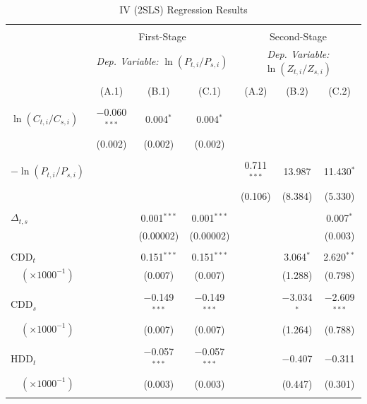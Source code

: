 \documentclass[11pt,a4paper]{extarticle}
\begin{document}
\begin{table}[!htbp] \centering 
	\caption{IV (2SLS) Regression Results}
	\label{table:2} 
	\small
	\begin{tabular}{@{\extracolsep{4pt}}lcccccc} 
		\\[-4ex]\hline  
		\hline \\[-1.6ex] 
		& \multicolumn{3}{c}{First-Stage} & \multicolumn{3}{c}{Second-Stage} \\ [0.5ex]
		& \multicolumn{3}{c}{\textit{Dep. Variable:} $\ln (P_{t,i} / P_{s,i})$ } & \multicolumn{3}{c}{\textit{Dep. Variable:}  $\ln (Z_{ t, i} / Z_{ s, i})$}\\ [0.5ex]
		\cmidrule(lr){2-4} \cmidrule(lr){5-7}\\[-2.2ex] 
		& (A.1) & (B.1) & (C.1) & (A.2) & (B.2) & (C.2)\\ [0.5ex]
		\hline \\[-1.8ex] 
		$ \ln (C_{t,i} / C_{s,i})$ & $-$0.060$^{***}$ & 0.004$^{*}$ & 0.004$^{*}$ &  &  &  \\ 
		& (0.002) & (0.002) & (0.002) &  &  &  \\ 
		& & & & & & \\ 
		$-\ln (P_{t,i} / P_{s,i})$ &  &  &  & 0.711$^{***}$ & 13.987 & 11.430$^{*}$ \\ 
		&  &  &  & (0.106) & (8.384) & (5.330) \\ 
		& & & & & & \\ 
		$\Delta_{t,s}$  &  & 0.001$^{***}$ & 0.001$^{***}$ &  &  & 0.007$^{*}$ \\ 
		&  & (0.00002) & (0.00002) &  &  & (0.003) \\ 
		& & & & & & \\ 
		CDD$_t$  &  & 0.151$^{***}$ & 0.151$^{***}$ &  & 3.064$^{*}$ & 2.620$^{**}$ \\ 
		$\quad(\times 1000^{-1})$&  & (0.007) & (0.007) &  & (1.288) & (0.798) \\ 
		& & & & & & \\ 
		CDD$_s$  &  & $-$0.149$^{***}$ & $-$0.149$^{***}$ &  & $-$3.034$^{*}$ & $-$2.609$^{***}$ \\ 
		$\quad(\times 1000^{-1})$&  & (0.007) & (0.007) &  & (1.264) & (0.788) \\ 
		& & & & & & \\ 
		HDD$_t$  &  & $-$0.057$^{***}$ & $-$0.057$^{***}$ &  & $-$0.407 & $-$0.311 \\ 
		$\quad(\times 1000^{-1})$&  & (0.003) & (0.003) &  & (0.447) & (0.301) \\ 
		& & & & & & \\ 

\end{tabular}
\end{table}
\end{document}
